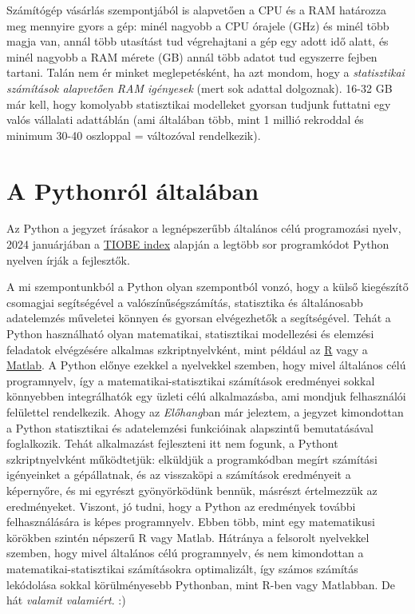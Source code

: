 \documentclass[
]{book}
\begin{document}
Számítógép vásárlás szempontjából is alapvetően a CPU és a RAM határozza meg mennyire gyors a gép: minél nagyobb a CPU órajele (GHz) és minél több magja van, annál több utasítást tud végrehajtani a gép egy adott idő alatt, és minél nagyobb a RAM mérete (GB) annál több adatot tud egyszerre fejben tartani.
Talán nem ér minket meglepetésként, ha azt mondom, hogy a \emph{statisztikai számítások alapvetően RAM igényesek} (mert sok adattal dolgoznak). 16-32 GB már kell, hogy komolyabb statisztikai modelleket gyorsan tudjunk futtatni egy valós vállalati adattáblán (ami általában több, mint 1 millió rekroddal és minimum 30-40 oszloppal = változóval rendelkezik).

\section{A Pythonról általában}\label{a-pythonruxf3l-uxe1ltaluxe1ban}

Az Python a jegyzet írásakor a legnépszerűbb általános célú programozási nyelv, 2024 januárjában a \href{https://www.tiobe.com/tiobe-index/}{TIOBE index} alapján a legtöbb sor programkódot Python nyelven írják a fejlesztők.

A mi szempontunkból a Python olyan szempontból vonzó, hogy a külső kiegészítő csomagjai segítségével a valószínűségszámítás, statisztika és általánosabb adatelemzés műveletei könnyen és gyorsan elvégezhetők a segítségével. Tehát a Python használható olyan matematikai, statisztikai modellezési és elemzési feladatok elvégzésére alkalmas szkriptnyelvként, mint például az \href{https://cran.r-project.org/}{R} vagy a \href{https://www.mathworks.com/products/matlab.html}{Matlab}. A Python előnye ezekkel a nyelvekkel szemben, hogy mivel általános célú programnyelv, így a matematikai-statisztikai számítások eredményei sokkal könnyebben integrálhatók egy üzleti célú alkalmazásba, ami mondjuk felhasználói felülettel rendelkezik.
Ahogy az \emph{Előhang}ban már jeleztem, a jegyzet kimondottan a Python statisztikai és adatelemzési funkcióinak alapszintű bemutatásával foglalkozik. Tehát alkalmazást fejleszteni itt nem fogunk, a Pythont szkriptnyelvként működtetjük: elküldjük a programkódban megírt számítási igényeinket a gépállatnak, és az visszaköpi a számítások eredményeit a képernyőre, és mi egyrészt gyönyörködünk bennük, másrészt értelmezzük az eredményeket. Viszont, jó tudni, hogy a Python az eredmények további felhasználására is képes programnyelv. Ebben több, mint egy matematikusi körökben szintén népszerű R vagy Matlab. Hátránya a felsorolt nyelvekkel szemben, hogy mivel általános célú programnyelv, és nem kimondottan a matematikai-statisztikai számításokra optimalizált, így számos számítás lekódolása sokkal körülményesebb Pythonban, mint R-ben vagy Matlabban. De hát \emph{valamit valamiért}. :)
\end{document}
